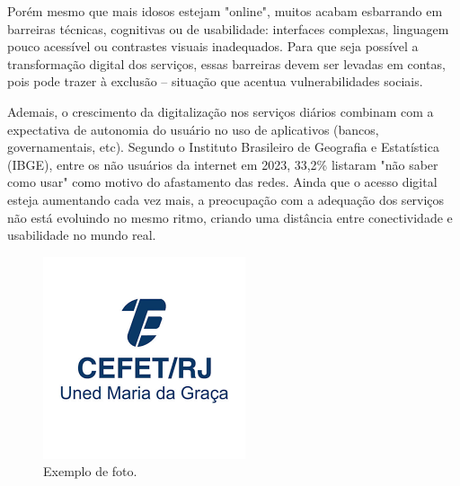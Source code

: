 Porém mesmo que mais idosos estejam "online", muitos acabam esbarrando em barreiras técnicas, cognitivas ou de usabilidade: interfaces complexas, linguagem pouco acessível ou contrastes visuais inadequados. Para que seja possível a transformação digital dos serviços, essas barreiras devem ser levadas em contas, pois pode trazer à exclusão -- situação que acentua vulnerabilidades sociais.

Ademais, o crescimento da digitalização nos serviços diários combinam com a expectativa de autonomia do usuário no uso de aplicativos (bancos, governamentais, etc). Segundo o Instituto Brasileiro de Geografia e Estatística (IBGE), entre os não usuários da internet em 2023, 33,2\% listaram "não saber como usar" como motivo do afastamento das redes. Ainda que o acesso digital esteja aumentando cada vez mais, a preocupação com a adequação dos serviços não está evoluindo no mesmo ritmo, criando uma distância entre conectividade e usabilidade no mundo real.




\label{sec:introducao}

\begin{figure}[H]
\centering
\includegraphics[width=0.5\linewidth]{imagens/cefet.png}
\caption{Exemplo de foto.}
\label{fig:cefet}
\end{figure}

